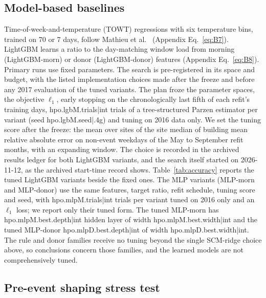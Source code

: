 \subsection{Model-based baselines}\label{sec:methods:models}

Time-of-week-and-temperature (TOWT) regressions with six temperature bins, trained on 70 or 7 days, follow Mathieu et al.\ \cite{mathieu2011} (Appendix Eq.~\eqref{eq:B7}). LightGBM \cite{ke2017lightgbm} learns a ratio to the day-matching window load from morning (LightGBM-morn) or donor (LightGBM-donor) features (Appendix Eq.~\eqref{eq:B8}). Primary runs use fixed parameters. The search is pre-registered in its space and budget, with the listed implementation choices made after the freeze and before any 2017 evaluation of the tuned variants. The plan froze the parameter spaces, the objective $\ell_1$, early stopping on the chronologically last fifth of each refit's training days, {{hpo.lgbM.trials|int}} trials of a tree-structured Parzen estimator per variant (seed {{hpo.lgbM.seed|.4g}}) and tuning on 2016 data only. We set the tuning score after the freeze: the mean over sites of the site median of building mean relative absolute error on non-event weekdays of the May to September refit months, with an expanding window. The choice is recorded in the archived results ledger for both LightGBM variants, and the search itself started on 2026-11-12, as the archived start-time record shows. Table~\ref{tab:accuracy} reports the tuned LightGBM variants beside the fixed ones. The MLP variants (MLP-morn and MLP-donor) use the same features, target ratio, refit schedule, tuning score and seed, with {{hpo.mlpM.trials|int}} trials per variant tuned on 2016 only and an $\ell_1$ loss; we report only their tuned form. The tuned MLP-morn has {{hpo.mlpM.best.depth|int}} hidden layer of width {{hpo.mlpM.best.width|int}} and the tuned MLP-donor {{hpo.mlpD.best.depth|int}} of width {{hpo.mlpD.best.width|int}}. The rule and donor families receive no tuning beyond the single SCM-ridge choice above, so conclusions concern those families, and the learned models are not comprehensively tuned.

\subsection{Pre-event shaping stress test}\label{sec:methods:shaping}

